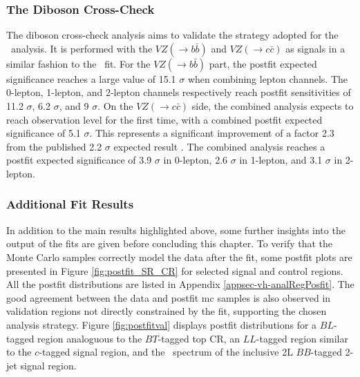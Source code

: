 \subsubsection{The Diboson Cross-Check}\label{subsec-DibosonC}
The diboson cross-check analysis aims to validate the strategy adopted for the \vhbc\ analysis. It is performed with the $VZ (\rightarrow b\bar{b})$ and $VZ (\rightarrow c\bar{c})$ as signals in a similar fashion to the \vhbc\ fit. For the $VZ (\rightarrow b\bar{b})$ part, the postfit expected significance reaches a large value of 15.1 $\sigma$ when combining lepton channels. The 0-lepton, 1-lepton, and 2-lepton channels respectively reach postfit sensitivities of 11.2 $\sigma$, 6.2 $\sigma$, and 9 $\sigma$. On the $VZ (\rightarrow c\bar{c})$ side, the combined analysis expects to reach observation level for the first time, with a combined postfit expected significance of 5.1 $\sigma$. This represents a significant improvement of a factor 2.3 from the published 2.2 $\sigma$ expected result \cite{Collaboration:2721696}. The combined analysis reaches a postfit expected significance of 3.9 $\sigma$ in 0-lepton, 2.6 $\sigma$ in 1-lepton, and 3.1 $\sigma$ in 2-lepton.

\subsubsection{Additional Fit Results}
In addition to the main results highlighted above, some further insights into the output of the fits are given before concluding this chapter. To verify that the Monte Carlo samples correctly model the data after the fit, some postfit plots are presented in Figure \ref{fig:postfit_SR_CR} for selected signal and control regions. All the postfit distributions are listed in Appendix \ref{appsec-vh-analRegPosfit}. The good agreement between the data and postfit \gls{mc} samples is also observed in validation regions not directly constrained by the fit, supporting the chosen analysis strategy. Figure \ref{fig:postfitval} displays postfit distributions for a $BL$-tagged region analoguous to the $BT$-tagged top CR, an $LL$-tagged region similar to the $c$-tagged signal region, and the \ptv\ spectrum of the inclusive 2L $BB$-tagged 2-jet signal region. \\ %

